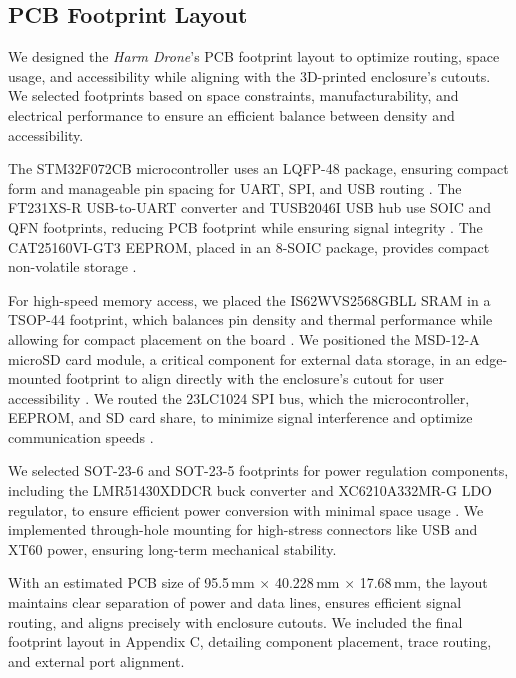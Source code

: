 \documentclass[12pt]{article}
\begin{document}
\subsection{PCB Footprint Layout}

\par We designed the \textit{Harm Drone}’s PCB footprint layout to optimize routing, space usage, and accessibility while aligning with the 3D-printed enclosure’s cutouts. We selected footprints based on space constraints, manufacturability, and electrical performance to ensure an efficient balance between density and accessibility.

\par The STM32F072CB microcontroller uses an LQFP-48 package, ensuring compact form and manageable pin spacing for UART, SPI, and USB routing \cite{stm32}. The FT231XS-R USB-to-UART converter and TUSB2046I USB hub use SOIC and QFN footprints, reducing PCB footprint while ensuring signal integrity \cite{ft231x} \cite{tusb2046i}. The CAT25160VI-GT3 EEPROM, placed in an 8-SOIC package, provides compact non-volatile storage \cite{cat25160}.

\par For high-speed memory access, we placed the IS62WVS2568GBLL SRAM in a TSOP-44 footprint, which balances pin density and thermal performance while allowing for compact placement on the board \cite{is62}. We positioned the MSD-12-A microSD card module, a critical component for external data storage, in an edge-mounted footprint to align directly with the enclosure’s cutout for user accessibility \cite{msd12}. We routed the 23LC1024 SPI bus, which the microcontroller, EEPROM, and SD card share, to minimize signal interference and optimize communication speeds \cite{23lc1024}.

\par We selected SOT-23-6 and SOT-23-5 footprints for power regulation components, including the LMR51430XDDCR buck converter and XC6210A332MR-G LDO regulator, to ensure efficient power conversion with minimal space usage \cite{lmr51430} \cite{xc6210}. We implemented through-hole mounting for high-stress connectors like USB and XT60 power, ensuring long-term mechanical stability.

\par With an estimated PCB size of 95.5\,mm $\times$ 40.228\,mm $\times$ 17.68\,mm, the layout maintains clear separation of power and data lines, ensures efficient signal routing, and aligns precisely with enclosure cutouts. We included the final footprint layout in Appendix C, detailing component placement, trace routing, and external port alignment.
\end{document}
